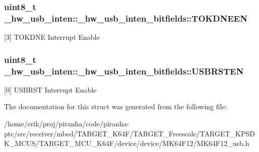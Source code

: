 \subsubsection[{\texorpdfstring{T\+O\+K\+D\+N\+E\+EN}{TOKDNEEN}}]{\setlength{\rightskip}{0pt plus 5cm}uint8\+\_\+t \+\_\+hw\+\_\+usb\+\_\+inten\+::\+\_\+hw\+\_\+usb\+\_\+inten\+\_\+bitfields\+::\+T\+O\+K\+D\+N\+E\+EN}\hypertarget{struct__hw__usb__inten_1_1__hw__usb__inten__bitfields_a3eae07db128f316ce8ddf8deb26465cd}{}\label{struct__hw__usb__inten_1_1__hw__usb__inten__bitfields_a3eae07db128f316ce8ddf8deb26465cd}
\mbox{[}3\mbox{]} T\+O\+K\+D\+NE Interrupt Enable 
\subsubsection[{\texorpdfstring{U\+S\+B\+R\+S\+T\+EN}{USBRSTEN}}]{\setlength{\rightskip}{0pt plus 5cm}uint8\+\_\+t \+\_\+hw\+\_\+usb\+\_\+inten\+::\+\_\+hw\+\_\+usb\+\_\+inten\+\_\+bitfields\+::\+U\+S\+B\+R\+S\+T\+EN}\hypertarget{struct__hw__usb__inten_1_1__hw__usb__inten__bitfields_a453f301f834b3c14baa862cf391235d5}{}\label{struct__hw__usb__inten_1_1__hw__usb__inten__bitfields_a453f301f834b3c14baa862cf391235d5}
\mbox{[}0\mbox{]} U\+S\+B\+R\+ST Interrupt Enable 

The documentation for this struct was generated from the following file\+:\begin{DoxyCompactItemize}
\item 
/home/erik/proj/piranha/code/piranha-\/ptc/src/receiver/mbed/\+T\+A\+R\+G\+E\+T\+\_\+\+K64\+F/\+T\+A\+R\+G\+E\+T\+\_\+\+Freescale/\+T\+A\+R\+G\+E\+T\+\_\+\+K\+P\+S\+D\+K\+\_\+\+M\+C\+U\+S/\+T\+A\+R\+G\+E\+T\+\_\+\+M\+C\+U\+\_\+\+K64\+F/device/device/\+M\+K64\+F12/M\+K64\+F12\+\_\+usb.\+h\end{DoxyCompactItemize}
